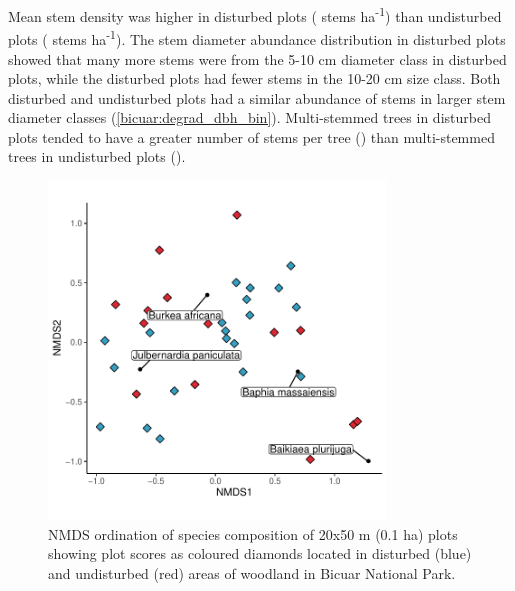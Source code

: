 \begin{refsection}
Mean stem density was higher in disturbed plots (\stemdensdegrad{} stems ha\textsuperscript{-1}) than undisturbed plots (\stemdensbicuar{} stems ha\textsuperscript{-1}). The stem diameter abundance distribution in disturbed plots showed that many more stems were from the 5-10 cm diameter class in disturbed plots, while the disturbed plots had fewer stems in the 10-20 cm size class. Both disturbed and undisturbed plots had a similar abundance of stems in larger stem diameter classes (\autoref{bicuar:degrad_dbh_bin}). Multi-stemmed trees in disturbed plots tended to have a greater number of stems per tree (\multistemdegrad{}) than multi-stemmed trees in undisturbed plots (\multistembicuar{}).

\begin{figure}[!h]
\centering
	\includegraphics[width=0.8\textwidth]{img/bicuar_degrad_nmds}
	\caption[NMDS ordination of undisturbed and disturbed plots in Bicuar National Park]{NMDS ordination of species composition of 20x50 m (0.1 ha) plots showing plot scores as coloured diamonds located in disturbed (blue) and undisturbed (red) areas of woodland in Bicuar National Park.}
	\label{bicuar:bicuar_degrad_nmds}
\end{figure}


\end{refsection}
